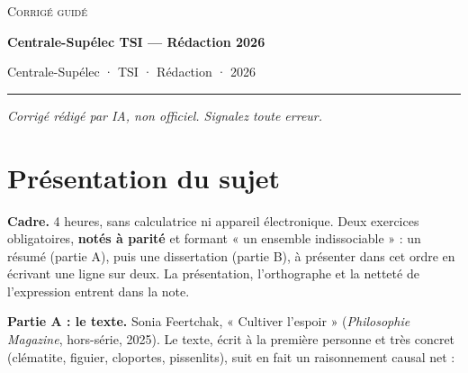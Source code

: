 \documentclass[11pt,a4paper]{article}
\begin{document}
\thispagestyle{plain}
\begin{center}
  {\small\scshape Corrigé guidé}\par\smallskip
  {\LARGE\bfseries Centrale-Supélec TSI — Rédaction 2026\par}\medskip
  {\large Centrale-Supélec · TSI · Rédaction · 2026\par}
\end{center}
\vspace{2pt}\hrule\vspace{8pt}

\emph{Corrigé rédigé par IA, non officiel. Signalez toute erreur.}

\hypertarget{pruxe9sentation-du-sujet}{%
\section{Présentation du sujet}\label{pruxe9sentation-du-sujet}}

\textbf{Cadre.} 4 heures, sans calculatrice ni appareil électronique. Deux exercices obligatoires, \textbf{notés à parité} et formant « un ensemble indissociable » : un résumé (partie A), puis une dissertation (partie B), à présenter dans cet ordre en écrivant une ligne sur deux. La présentation, l'orthographe et la netteté de l'expression entrent dans la note.

\textbf{Partie A : le texte.} Sonia Feertchak, « Cultiver l'espoir » (\emph{Philosophie Magazine}, hors-série, 2025). Le texte, écrit à la première personne et très concret (clématite, figuier, cloportes, pissenlits), suit en fait un raisonnement causal net :
\end{document}
